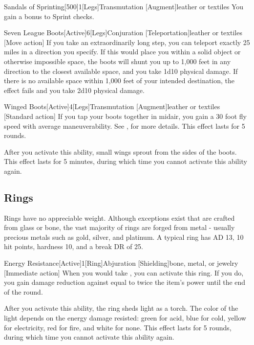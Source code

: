         \begin{magicitemdef}{Sandals of Sprinting}[500]{1}[Legs]{Transmutation [Augment]}{leather or textiles}
             You gain a  bonus to Sprint checks.
        \end{magicitemdef}

        \begin{magicitemdef}{Seven League Boots}[Active]{6}[Legs]{Conjuration [Teleportation]}{leather or textiles}
            [Move action] If you take an extraordinarily long step, you can teleport exactly 25 miles in a direction you specify.
            If this would place you within a solid object or otherwise impossible space, the boots will shunt you up to 1,000 feet in any direction to the closest available space, and you take 1d10 physical damage.
            If there is no available space within 1,000 feet of your intended destination, the effect fails and you take 2d10 physical damage.
        \end{magicitemdef}

        \begin{magicitemdef}{Winged Boots}[Active]{4}[Legs]{Transmutation [Augment]}{leather or textiles}
            [Standard action] If you tap your boots together in midair, you gain a 30 foot fly speed with average maneuverability.
            See , for more details.
            This effect lasts for 5 rounds.

            After you activate this ability, small wings sprout from the sides of the boots.
            This effect lasts for 5 minutes, during which time you cannot activate this ability again.
        \end{magicitemdef}

    \subsection{Rings}

         Rings have no appreciable weight.
        Although exceptions exist that are crafted from glass or bone, the vast majority of rings are forged from metal - usually precious metals such as gold, silver, and platinum.
        A typical ring has AD 13, 10 hit points, hardness 10, and a break DR of 25.

        \begin{magicitemdef}{Energy Resistance}[Active]{1}[Ring]{Abjuration [Shielding]}{bone, metal, or jewelry}
            [Immediate action] When you would take , you can activate this ring.
            If you do, you gain damage reduction against  equal to twice the item's power until the end of the round.

            After you activate this ability, the ring sheds light as a torch.
            The color of the light depends on the energy damage resisted: green for acid, blue for cold, yellow for electricity, red for fire, and white for none.
            This effect lasts for 5 rounds, during which time you cannot activate this ability again.
        \end{magicitemdef}

